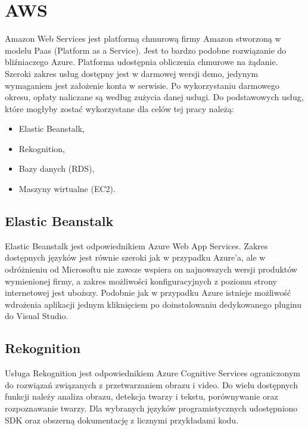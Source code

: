 \section{AWS} \label{aws}
Amazon Web Services jest platformą chmurową firmy Amazon stworzoną w modelu Paas (Platform as a Service). Jest to bardzo podobne rozwiązanie do bliźniaczego Azure. Platforma udostępnia obliczenia chmurowe na żądanie. Szeroki zakres usług dostępny jest w darmowej wersji demo, jedynym wymaganiem jest założenie konta w serwisie. Po wykorzystaniu darmowego okresu, opłaty naliczane są według zużycia danej usługi. Do podstawowych usług, które mogłyby zostać wykorzystane dla celów tej pracy należą:
\begin{itemize}
    \item Elastic Beanstalk,
    \item Rekognition,
    \item Bazy danych (RDS),
    \item Maszyny wirtualne (EC2).
\end{itemize}
\subsection{Elastic Beanstalk}
Elastic Beanstalk jest odpowiednikiem Azure Web App Services. Zakres dostępnych języków jest równie szeroki jak w przypadku Azure'a, ale w odróżnieniu od Microsoftu nie zawsze wspiera on najnowszych wersji produktów wymienionej firmy, a zakres możliwości konfiguracyjnych z poziomu strony internetowej jest uboższy. Podobnie jak w przypadku Azure istnieje możliwość wdrożenia aplikacji jednym kliknięciem po doinstalowaniu dedykowanego pluginu do Visual Studio.
\subsection{Rekognition}
Usługa Rekognition jest odpowiednikiem Azure Cognitive Services ograniczonym do rozwiązań związanych z przetwarzaniem obrazu i video. Do wielu dostępnych funkcji należy analiza obrazu, detekcja twarzy i tekstu, porównywanie oraz rozpoznawanie twarzy. Dla wybranych języków programistycznych udostępniono SDK oraz obszerną dokumentację z licznymi przykładami kodu.